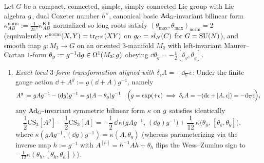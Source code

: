 \begin{proposition}
\label{prop:cs3-large-gauge-nw}
Let $G$ be a compact, connected, simple, simply connected Lie group with Lie algebra $g$, dual Coxeter number $h^\vee$, canonical basic $\operatorname{Ad}_G$-invariant bilinear form $\kappa^{\mathrm{norm}}_{AB} := \frac{1}{2h^\vee}\kappa^{\mathrm{Kill}}_{AB}$ normalized so long roots satisfy $(\theta_{\max},\theta_{\max})_{\mathrm{norm}} = 2$ (equivalently $\kappa^{\mathrm{norm}}(X,Y) = \operatorname{tr}_{C^N}(X Y)$ on $g_{C} = sl_N(C)$ for $G = \operatorname{SU}(N)$), and smooth map $g : M_3 \to G$ on an oriented $3$-manifold $M_3$ with left-invariant Maurer--Cartan $1$-form $\theta_g := g^{-1}\mathrm{d} g \in \Omega^1(M_3;g)$ obeying $\dd\theta_g = -\frac{1}{2}[\theta_g,\theta_g]$.
\begin{enumerate}[label=(\arabic*),leftmargin=*]
  \item \emph{Exact local $3$-form transformation aligned with $\delta_\epsilon A = -\dd_\nabla\epsilon$:} Under the finite gauge action $\dd + A^g := g(\dd + A)g^{-1}$, namely
  \begin{equation}
  \label{eq:finite-gauge-Ag}
  A^g := g A g^{-1} - (\mathrm{d} g)g^{-1} = g(A - \theta_g)g^{-1}
  \quad\Bigl(g = \exp(+\epsilon) \implies \delta_\epsilon A = -(\mathrm{d}\epsilon + [A,\epsilon]) = -\mathrm{d}_\nabla\epsilon\Bigr),
  \end{equation}
  any $\operatorname{Ad}_G$-invariant symmetric bilinear form $\kappa$ on $g$ satisfies identically
  \begin{equation}
  \label{eq:cs3-finite-shift-exact}
  \frac{1}{2}\mathrm{CS}_3[A^g] - \frac{1}{2}\mathrm{CS}_3[A] = -\frac{1}{2}\,\dd\,\kappa\bigl(g A g^{-1},\, (\dd g)g^{-1}\bigr) + \frac{1}{12}\,\kappa\bigl(\theta_g,\, [\theta_g, \theta_g]\bigr),
  \end{equation}
  where $\kappa(g A g^{-1}, (\dd g)g^{-1}) = \kappa(A, \theta_g)$ (whereas parameterizing via the inverse map $h := g^{-1}$ with $A^{[h]} = h^{-1}A h + \theta_h$ flips the Wess--Zumino sign to $-\frac{1}{12}\kappa(\theta_h,[\theta_h,\theta_h])$).


\end{enumerate}
\end{proposition}
